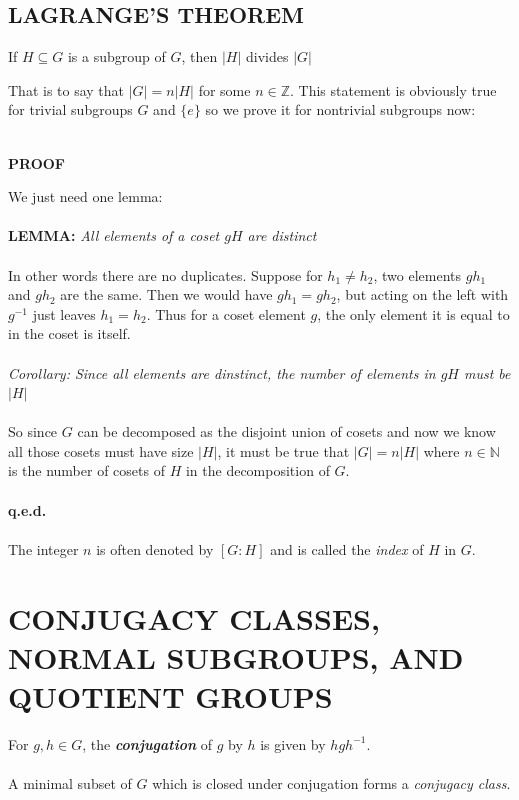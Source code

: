 \documentclass[9 pt]{report}
\begin{document}
{\centering
	\subsection*{LAGRANGE'S THEOREM}}
\begin{tcolorbox}
	If $H\subseteq G$ is a subgroup of $G$, then $|H|$ divides $|G|$ 
\end{tcolorbox}
That is to say that $|G| = n|H|$ for some $n\in\mathbb{Z}$. This statement is obviously true for trivial subgroups $G$ and $\{e\}$ so we prove it for nontrivial subgroups now:
\\
\\
\begin{center}
	\textbf{PROOF}
\end{center}
We just need one lemma:
\\
\\
\textbf{LEMMA:} \emph{All elements of a coset $gH$ are distinct}
\\
\\
In other words there are no duplicates. Suppose for $h_1\neq h_2$, two elements $gh_1$ and $gh_2$ are the same. Then we would have $gh_1 = gh_2$, but acting on the left with $g^{-1}$ just leaves $h_1=h_2$. Thus for a coset element $g$, the only element it is equal to in the coset is itself.
\\
\\
\emph{Corollary: Since all elements are dinstinct, the number of elements in $gH$ must be $|H|$} 
\\
\\
So since $G$ can be decomposed as the disjoint union of cosets and now we know all those cosets must have size $|H|$, it must be true that $|G|=n|H|$ where $n\in \mathbb{N}$ is the number of cosets of $H$ in the decomposition of $G$.
\\
\\
\textbf{q.e.d.}
\\
\\
The integer $n$ is often denoted by $[G:H]$ and is called the \emph{index} of $H$ in $G$. 


{\centering
\section*{CONJUGACY CLASSES, NORMAL SUBGROUPS, AND QUOTIENT GROUPS}}
\begin{tcolorbox}
	For $g,h \in G$, the \textbf{\emph{conjugation}} of $g$ by $h$ is given by $ h gh^{-1} $. 
	\\
	\\
	A minimal subset of $G$ which is closed under conjugation forms a \emph{conjugacy class}. 
\end{tcolorbox}
\end{document}
